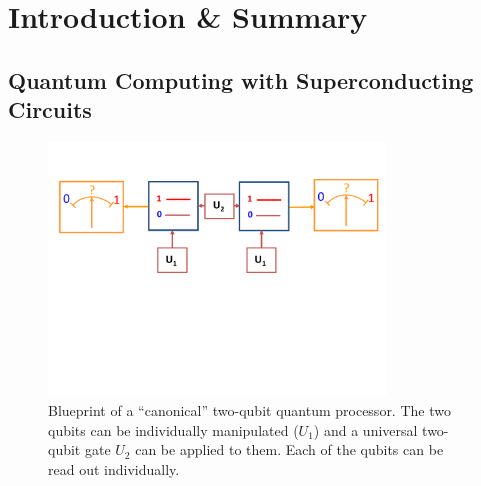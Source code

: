 \chapter{Introduction \& Summary}


\section{Quantum Computing with Superconducting Circuits} \label{section:divincenzo_criteria}

%
\begin{figure}
\centering \includegraphics[width=0.8\textwidth]{./material/papers/grover/submission1/Fig1}
\caption[Blueprint of a {}``canonical'' two-qubit quantum processor]{Blueprint of a {}``canonical'' two-qubit quantum processor. The two qubits can be individually manipulated ($U_{1}$) and
a universal two-qubit gate $U_{2}$ can be applied to them. Each of
the qubits can be read out individually.}


\label{fig:qubit_processor_blueprint} %
\end{figure}


